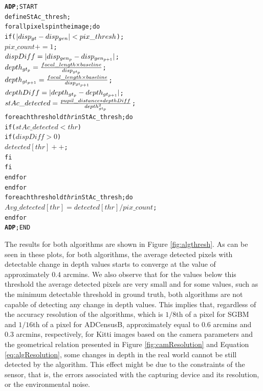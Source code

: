\begin{alltt}
\textbf{ADP}; START
      define StAc\_thresh;
      for all pixels p in the image; do
         if (\( |disp\sb{gt}-disp\sb{gen}|<pix\_thresh\));
            \(pix\_count += 1\);
            \(dispDiff = |disp\sb{gen\sb{p}}-disp\sb{gen\sb{p+1}}|\);
            \(depth\sb{gt\sb{p}} = \frac{focal\_length \times baseline}{disp\sb{gt\sb{p}}}\);
            \(depth\sb{gt\sb{p+1}} = \frac{focal\_length \times baseline}{disp\sb{gt\sb{p+1}}}\);
            \(depthDiff = |depth\sb{gt\sb{p}}-depth\sb{gt\sb{p+1}}|\);
            \(stAc\_detected = \frac{pupil\_distance*depthDiff}{depth\sb{gt\sb{p}}\sp{2}}\);
            for each threshold \textit{thr} in StAc\_thresh; do
               if (\(stAc\_detected<thr\))
                  if (\(dispDiff>0\))
                     \(detected[thr]++\);
                  fi
               fi
            end for
      end for
      for each threshold \textit{thr} in StAc\_thresh; do
         \(Avg\_detected[thr] = detected[thr]/pix\_count\);
      end for
\textbf{ADP}; END
\end{alltt}
The results for both algorithms are shown in Figure \ref{fig:algthresh}.
As can be seen in these plots, for both algorithms, the average detected pixels with detectable change in depth values 
starts to converge at the value of approximately $0.4$ arcmins.
We also observe that for the values below this threshold the average detected pixels are very small and for some values, 
such as the minimum detectable threshold in ground truth,
both algorithms are not capable of detecting any change in depth values. 
This implies that, regardless of the accuracy resolution of the algorithms, which is $1/8$th of a pixel for SGBM and $1/16$th of a pixel for ADCensusB, approximately equal to
$0.6$ arcmins and $0.3$ arcmins, respectively, for Kitti images based on the camera parameters and the geometrical relation presented in Figure \ref{fig:camResolution} and 
Equation \ref{eq:algResolution}, some changes in 
depth in the real world cannot be still detected by the algorithm. This effect might be due to the constraints of the sensor, that is, the errors associated with the capturing 
device and its resolution, or the environmental noise. 

